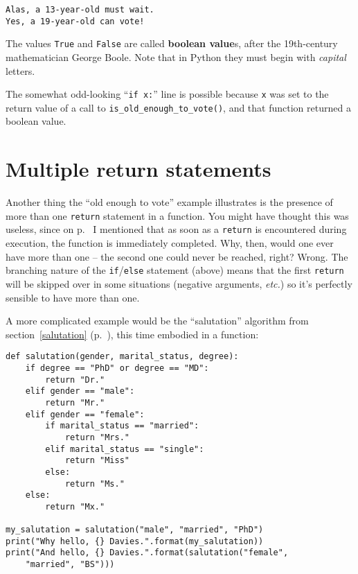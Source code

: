 \begin{Verbatim}[fontsize=\small,samepage=true,frame=leftline,framesep=5mm,framerule=1mm]
Alas, a 13-year-old must wait.
Yes, a 19-year-old can vote!
\end{Verbatim}

\smallskip
{}
The values \texttt{True} and \texttt{False} are called \textbf{boolean value}s,
after the 19th-century mathematician George Boole. Note that in Python they
must begin with \textit{capital} letters.

\smallskip

The somewhat odd-looking ``\texttt{if x:}'' line is possible because \texttt{x}
was set to the return value of a call to \texttt{is\_old\_enough\_to\_vote()},
and that function returned a boolean value.


\section{Multiple return statements}

Another thing the ``old enough to vote'' example illustrates is the presence of more than one
\texttt{return} statement in a function. You might have thought this was
useless, since on p.~\pageref{returnImmediatelyReturns} I mentioned that as
soon as a \texttt{return} is encountered during execution, the function is
immediately completed. Why, then, would one ever have more than one -- the
second one could never be reached, right? Wrong. The branching nature of the
\texttt{if}/\texttt{else} statement (above) means that the first
\texttt{return} will be skipped over in some situations (negative arguments,
\textit{etc.}) so it's perfectly sensible to have more than one.

\pagebreak

A more complicated example would be the ``salutation'' algorithm from
section~\ref{salutation} (p.~\pageref{salutation}), this time embodied in a
function:

\begin{Verbatim}[fontsize=\small,samepage=true,frame=single,framesep=3mm]
def salutation(gender, marital_status, degree):
    if degree == "PhD" or degree == "MD":
        return "Dr."
    elif gender == "male":
        return "Mr."
    elif gender == "female":
        if marital_status == "married":
            return "Mrs."
        elif marital_status == "single":
            return "Miss"
        else:
            return "Ms."
    else:
        return "Mx."

my_salutation = salutation("male", "married", "PhD")
print("Why hello, {} Davies.".format(my_salutation))
print("And hello, {} Davies.".format(salutation("female",
    "married", "BS")))
\end{Verbatim}
\vspace{-.4in}

